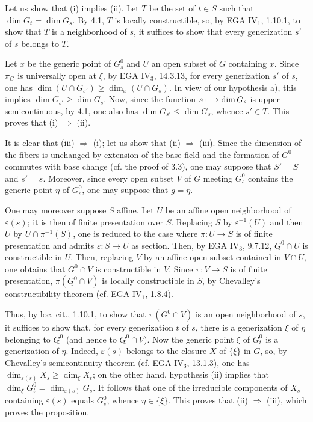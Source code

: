 Let us show that (i) implies (ii). Let $T$ be the set of $t\in S$ such that $\dim G_t=\dim G_s$. By 4.1, $T$ is locally constructible, so, by EGA IV$_1$, 1.10.1, to show that $T$ is a neighborhood of $s$, it suffices to show that every generization $s'$ of $s$ belongs to $T$.

Let $x$ be the generic point of $G_s^0$ and $U$ an open subset of $G$ containing $x$. Since $\pi_G$ is universally open at $\xi$, by EGA IV$_3$, 14.3.13, for every generization $s'$ of $s$, one has $\dim(U\cap G_{s'})\ge\dim_x(U\cap G_s)$. In view of our hypothesis a), this implies $\dim G_{s'}\ge\dim G_s$. Now, since the function $s\longmapsto\dim G_s$ is upper semicontinuous, by 4.1, one also has $\dim G_{s'}\le\dim G_s$, whence $s'\in T$. This proves that (i) $\Rightarrow$ (ii).

It is clear that (iii) $\Rightarrow$ (i); let us show that (ii) $\Rightarrow$ (iii). Since the dimension of the fibers is unchanged by extension of the base field and the formation of $\underline{G^0}$ commutes with base change (cf. the proof of 3.3), one may suppose that $S'=S$ and $s'=s$. Moreover, since every open subset $V$ of $G$ meeting $G_s^0$ contains the generic point $\eta$ of $G_s^0$, one may suppose that $g=\eta$.

One may moreover suppose $S$ affine. Let $U$ be an affine open neighborhood of $\varepsilon(s)$; it is then of finite presentation over $S$. Replacing $S$ by $\varepsilon^{-1}(U)$ and then $U$ by $U\cap\pi^{-1}(S)$, one is reduced to the case where $\pi:U\to S$ is of finite presentation and admits $\varepsilon:S\to U$ as section. Then, by EGA IV$_3$, 9.7.12, $\underline{G^0}\cap U$ is constructible in $U$. Then, replacing $V$ by an affine open subset contained in $V\cap U$, one obtains that $\underline{G^0}\cap V$ is constructible in $V$. Since $\pi:V\to S$ is of finite presentation, $\pi(\underline{G^0}\cap V)$ is locally constructible in $S$, by Chevalley's constructibility theorem (cf. EGA IV$_1$, 1.8.4).

Thus, by loc. cit., 1.10.1, to show that $\pi(\underline{G^0}\cap V)$ is an open neighborhood of $s$, it suffices to show that, for every generization $t$ of $s$, there is a generization $\xi$ of $\eta$ belonging to $\underline{G^0}$ (and hence to $\underline{G^0}\cap V$). Now the generic point $\xi$ of $G_t^0$ is a generization of $\eta$. Indeed, $\varepsilon(s)$ belongs to the closure $X$ of $\{\xi\}$ in $G$, so, by Chevalley's semicontinuity theorem (cf. EGA IV$_3$, 13.1.3), one has $\dim_{\varepsilon(s)}X_s\ge\dim_\xi X_t$; on the other hand, hypothesis (ii) implies that $\dim_\xi G_t^0=\dim_{\varepsilon(s)}G_s$. It follows that one of the irreducible components of $X_s$ containing $\varepsilon(s)$ equals $G_s^0$, whence $\eta\in\overline{\{\xi\}}$. This proves that (ii) $\Rightarrow$ (iii), which proves the proposition.

